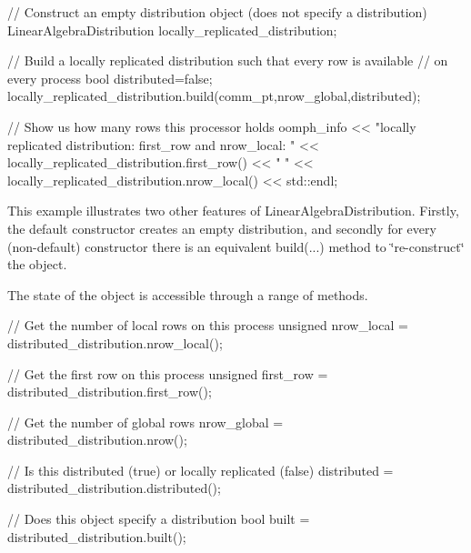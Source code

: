 \begin{DoxyCodeInclude}
  

  \textcolor{comment}{// Construct an empty distribution object (does not specify a distribution)}
  LinearAlgebraDistribution locally\_replicated\_distribution;
  
  \textcolor{comment}{// Build a locally replicated distribution such that every row is available}
  \textcolor{comment}{// on every process}
  \textcolor{keywordtype}{bool} distributed=\textcolor{keyword}{false};
  locally\_replicated\_distribution.build(comm\_pt,nrow\_global,distributed);
  
  \textcolor{comment}{// Show us how many rows this processor holds}
  oomph\_info << \textcolor{stringliteral}{"locally replicated distribution: first\_row and nrow\_local: "}
             << locally\_replicated\_distribution.first\_row() << \textcolor{stringliteral}{" "} 
             << locally\_replicated\_distribution.nrow\_local() 
             << std::endl;

\end{DoxyCodeInclude}


This example illustrates two other features of {\ttfamily Linear\+Algebra\+Distribution}. Firstly, the default constructor creates an empty distribution, and secondly for every (non-\/default) constructor there is an equivalent {\ttfamily build}(...) method to \char`\"{}re-\/construct\char`\"{} the object.

The state of the object is accessible through a range of methods.


\begin{DoxyCodeInclude}
  
  \textcolor{comment}{// Get the number of local rows on this process}
  \textcolor{keywordtype}{unsigned} nrow\_local = distributed\_distribution.nrow\_local();
  
  \textcolor{comment}{// Get the first row on this process}
  \textcolor{keywordtype}{unsigned} first\_row = distributed\_distribution.first\_row();
  
  \textcolor{comment}{// Get the number of global rows}
  nrow\_global = distributed\_distribution.nrow();
  
  \textcolor{comment}{// Is this distributed (true) or locally replicated (false)}
  distributed = distributed\_distribution.distributed();
  
  \textcolor{comment}{// Does this object specify a distribution}
  \textcolor{keywordtype}{bool} built = distributed\_distribution.built();

\end{DoxyCodeInclude}


